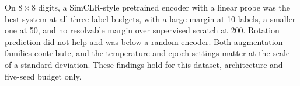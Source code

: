 On $8\times8$ digits, a SimCLR-style pretrained encoder with a linear probe was the best system at all three label budgets, with a large margin at 10 labels, a smaller one at 50, and no resolvable margin over supervised scratch at 200. Rotation prediction did not help and was below a random encoder. Both augmentation families contribute, and the temperature and epoch settings matter at the scale of a standard deviation. These findings hold for this dataset, architecture and five-seed budget only.
